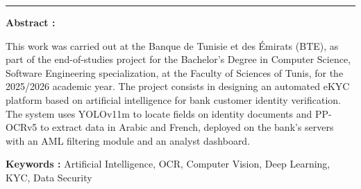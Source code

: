 \documentclass[12pt,a4paper]{report}
\begin{document}
{\vspace{0.6em}
\noindent\textcolor{bleu_principal}{\rule{\textwidth}{0.4pt}}
\vspace{0.5em}

{\normalsize\bfseries\color{bleu_principal} Abstract :}

\vspace{0.3em}
{\small
This work was carried out at the Banque de Tunisie et des Émirats (BTE), as part of the end-of-studies project for the Bachelor's Degree in Computer Science, Software Engineering specialization, at the Faculty of Sciences of Tunis, for the 2025/2026 academic year. The project consists in designing an automated eKYC platform based on artificial intelligence for bank customer identity verification. The system uses YOLOv11m to locate fields on identity documents and PP-OCRv5 to extract data in Arabic and French, deployed on the bank's servers with an AML filtering module and an analyst dashboard.
}

\vspace{0.2em}
{\small\textbf{Keywords :} Artificial Intelligence, OCR, Computer Vision, Deep Learning, KYC, Data Security}

}
\end{document}
